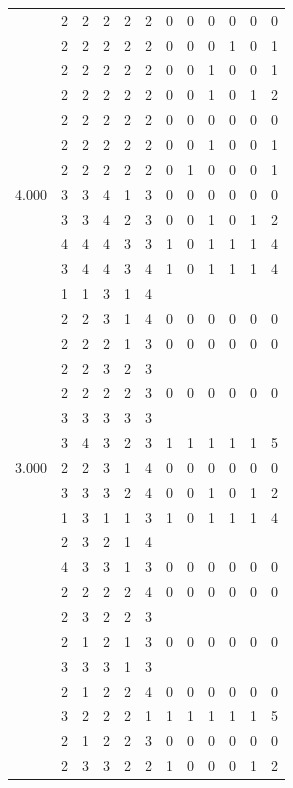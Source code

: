 \documentclass[]{book}
\theoremstyle{definition}
\theoremstyle{definition}
\theoremstyle{definition}
\theoremstyle{remark}
\begin{document}
\begin{table}
{\begin{tabular}[t]{rrrrrrrrrrrr}
 & 2 & 2 & 2 & 2 & 2 & 0 & 0 & 0 & 0 & 0 & 0\\
 & 2 & 2 & 2 & 2 & 2 & 0 & 0 & 0 & 1 & 0 & 1\\
 & 2 & 2 & 2 & 2 & 2 & 0 & 0 & 1 & 0 & 0 & 1\\
 & 2 & 2 & 2 & 2 & 2 & 0 & 0 & 1 & 0 & 1 & 2\\
 & 2 & 2 & 2 & 2 & 2 & 0 & 0 & 0 & 0 & 0 & 0\\
 & 2 & 2 & 2 & 2 & 2 & 0 & 0 & 1 & 0 & 0 & 1\\
 & 2 & 2 & 2 & 2 & 2 & 0 & 1 & 0 & 0 & 0 & 1\\
4.000 & 3 & 3 & 4 & 1 & 3 & 0 & 0 & 0 & 0 & 0 & 0\\
 & 3 & 3 & 4 & 2 & 3 & 0 & 0 & 1 & 0 & 1 & 2\\
 & 4 & 4 & 4 & 3 & 3 & 1 & 0 & 1 & 1 & 1 & 4\\
 & 3 & 4 & 4 & 3 & 4 & 1 & 0 & 1 & 1 & 1 & 4\\
 & 1 & 1 & 3 & 1 & 4 &  &  &  &  &  & \\
 & 2 & 2 & 3 & 1 & 4 & 0 & 0 & 0 & 0 & 0 & 0\\
 & 2 & 2 & 2 & 1 & 3 & 0 & 0 & 0 & 0 & 0 & 0\\
 & 2 & 2 & 3 & 2 & 3 &  &  &  &  &  & \\
 & 2 & 2 & 2 & 2 & 3 & 0 & 0 & 0 & 0 & 0 & 0\\
 & 3 & 3 & 3 & 3 & 3 &  &  &  &  &  & \\
 & 3 & 4 & 3 & 2 & 3 & 1 & 1 & 1 & 1 & 1 & 5\\
3.000 & 2 & 2 & 3 & 1 & 4 & 0 & 0 & 0 & 0 & 0 & 0\\
 & 3 & 3 & 3 & 2 & 4 & 0 & 0 & 1 & 0 & 1 & 2\\
 & 1 & 3 & 1 & 1 & 3 & 1 & 0 & 1 & 1 & 1 & 4\\
 & 2 & 3 & 2 & 1 & 4 &  &  &  &  &  & \\
 & 4 & 3 & 3 & 1 & 3 & 0 & 0 & 0 & 0 & 0 & 0\\
 & 2 & 2 & 2 & 2 & 4 & 0 & 0 & 0 & 0 & 0 & 0\\
 & 2 & 3 & 2 & 2 & 3 &  &  &  &  &  & \\
 & 2 & 1 & 2 & 1 & 3 & 0 & 0 & 0 & 0 & 0 & 0\\
 & 3 & 3 & 3 & 1 & 3 &  &  &  &  &  & \\
 & 2 & 1 & 2 & 2 & 4 & 0 & 0 & 0 & 0 & 0 & 0\\
 & 3 & 2 & 2 & 2 & 1 & 1 & 1 & 1 & 1 & 1 & 5\\
 & 2 & 1 & 2 & 2 & 3 & 0 & 0 & 0 & 0 & 0 & 0\\
 & 2 & 3 & 3 & 2 & 2 & 1 & 0 & 0 & 0 & 1 & 2\\

\end{tabular}}
\end{table}
\end{document}
